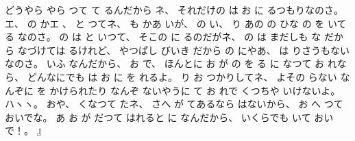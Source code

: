 どうやら
やら
つて
て
るんだから
%
ネ、
%
それだけの
は
お
に
るつもりなのさ。
%
エ、
%
の
かエ
、
%
%
と
つてネ、
%
も
かあ
いが、
%
の
い、
%
り
あの
の
ひな
の
を
いてる
なのさ。
%
の
は
と
いつて、
%
そこの
に
るのだがネ、
%
の
は
まだしも
な
だから
なづけては
るけれど、
%
やつぱし
びいき
だから
の
にやあ、
%
は
りさうもない
なのさ。
%
いふ
なんだから、
%
お
で、
%
ほんとに
お
が
の
を
る
に
なつて
お
れなら、
%
どんなにでも
は
お
に
を
れるよ。
%
%
り
お
つかりしてネ、
%
よその
らない
なんぞに
を
かけられたり
なんぞ
ないやうに
て
お
れで
くつちや
いけないよ。
%
ハヽヽ。
%
おや、
%
くなつて
たネ、
%
さへ
が
てあるなら
はないから、
%
お
へ
つて
おいでな。
%
あ
お
が
だつて
はれると
に
なんだから、
%
いくらでも
いて
おいで！。
』
